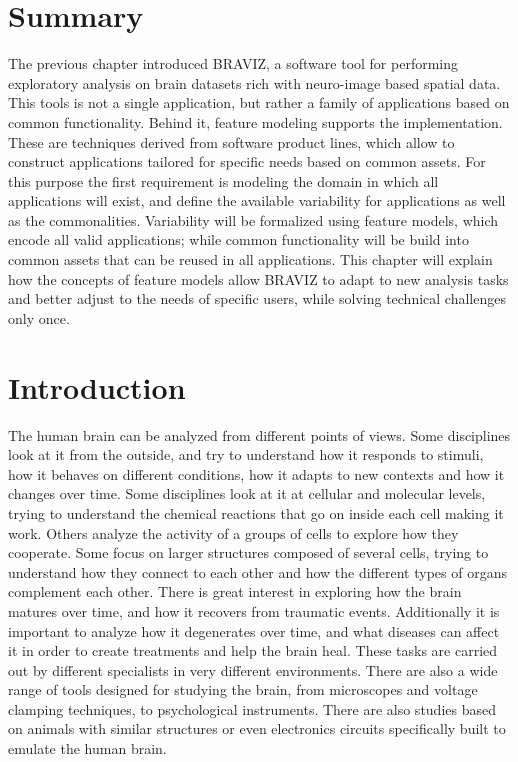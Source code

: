 
\section{Summary}

The previous chapter introduced BRAVIZ, a software tool for performing exploratory analysis on brain datasets rich with neuro-image based spatial data. This tools is not a single application, but rather a family of applications based on common functionality. Behind it, feature modeling supports the implementation. These are techniques derived from software product lines, which allow to construct applications tailored for specific needs based on common assets. For this purpose the first requirement is modeling the domain in which all applications will exist, and define the available variability for applications as well as the commonalities. Variability will be formalized using feature models, which encode all valid applications; while common functionality will be build into common assets that can be reused in all applications. This chapter will explain how the concepts of feature models allow BRAVIZ to adapt to new analysis tasks and better adjust to the needs of specific users, while solving technical challenges only once. 	

\section{Introduction}


The human brain can be analyzed from different points of views. Some disciplines look at it from the outside, and try to understand how it responds to stimuli, how it behaves on different conditions, how it adapts to new contexts and how it changes over time. Some disciplines look at it at cellular and molecular levels, trying to understand the chemical reactions that go on inside each cell making it work. Others analyze the activity of a groups of cells to explore how they cooperate. Some focus on larger structures composed of several cells, trying to understand how they connect to each other and how the different types of organs complement each other. There is great interest in exploring how the brain matures over time, and how it recovers from traumatic events. Additionally it is important to analyze how it degenerates over time, and what diseases can affect it in order to create treatments and help the brain heal. 
These tasks are carried out by different specialists in very different environments. There are also a wide range of tools designed for studying the brain, from microscopes and voltage clamping techniques, to psychological instruments. There are also studies based on animals with similar structures or even electronics circuits specifically built to emulate the human brain. 

